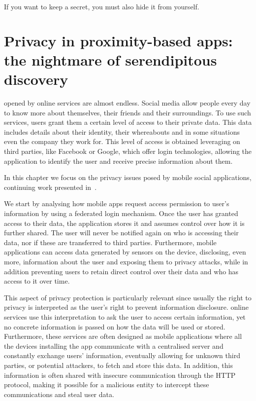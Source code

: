 \begin{savequote}[75mm]
If you want to keep a secret, you must also hide it from yourself.
\end{savequote}

\chapter{Privacy in proximity-based apps: the nightmare of serendipitous discovery}

 opened by online services are almost endless. Social media allow people every day to know more about themselves, their friends and their surroundings. To use such services, users grant them a certain level of access to their private data. This data includes details about their identity, their whereabouts and in some situations even the company they work for. This level of access is obtained leveraging on third parties, like Facebook or Google, which offer login technologies, allowing the application to identify the user and receive precise information about them.

In this chapter we focus on the privacy issues posed by mobile social applications, continuing work presented in~\cite{puglisi2015potential}.

We start by analysing how mobile apps request access permission to user's information by using a federated login mechanism. Once the user has granted access to their data, the application stores it and assumes control over how it is further shared. The user will never be notified again on who is accessing their data, nor if these are transferred to third parties. Furthermore, mobile applications can access data generated by sensors on the device, disclosing, even more, information about the user and exposing them to privacy attacks, while in addition preventing users to retain direct control over their data and who has access to it over time.

This aspect of privacy protection is particularly relevant since usually the right to privacy is interpreted as the user's right to prevent information disclosure. online services use this interpretation to ask the user to access certain information, yet no concrete information is passed on how the data will be used or stored. Furthermore, these services are often designed as mobile applications where all the devices installing the app communicate with a centralised server and constantly exchange users' information, eventually allowing for unknown third parties, or potential attackers, to fetch and store this data. In addition, this information is often shared with insecure communication through the HTTP protocol, making it possible for a malicious entity to intercept these communications and steal user data.

